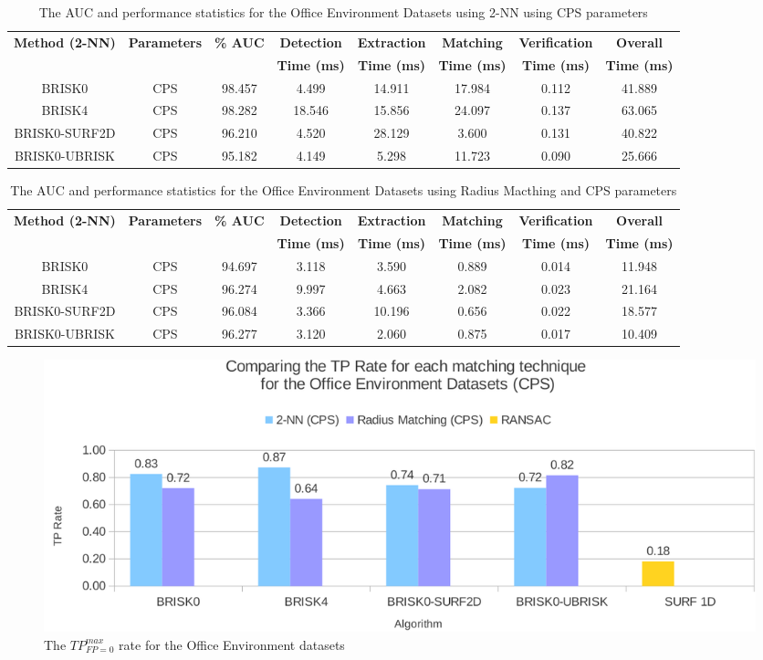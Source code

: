 \begin{table}
\centering
\caption{The AUC and performance statistics for the Office Environment Datasets
using 2-NN using CPS parameters}
\begin{tabular}{|c|c|c|c|c|c|c|c|}
\hline 
\textbf{Method (2-NN)} & \textbf{Parameters} & \textbf{\% AUC} & \textbf{Detection} & \textbf{Extraction} & \textbf{Matching} & \textbf{Verification} & \textbf{Overall}\tabularnewline
 &  &  & \textbf{Time (ms)} & \textbf{Time (ms)} & \textbf{Time (ms)} & \textbf{Time (ms)} & \textbf{Time (ms)}\tabularnewline
\hline 
\hline 
BRISK0 & CPS & 98.457 & 4.499 & 14.911 & 17.984 & 0.112 & 41.889\tabularnewline
\hline 
BRISK4 & CPS & 98.282 & 18.546 & 15.856 & 24.097 & 0.137 & 63.065\tabularnewline
\hline 
BRISK0-SURF2D & CPS & 96.210 & 4.520 & 28.129 & 3.600 & 0.131 & 40.822\tabularnewline
\hline 
BRISK0-UBRISK & CPS & 95.182 & 4.149 & 5.298 & 11.723 & 0.090 & 25.666\tabularnewline
\hline 
\end{tabular}
\label{app:oe_knn}
\end{table}

\begin{table}
\centering
\caption{The AUC and performance statistics for the Office Environment Datasets
using Radius Macthing and CPS parameters}
\begin{tabular}{|c|c|c|c|c|c|c|c|}
\hline 
\textbf{Method (2-NN)} & \textbf{Parameters} & \textbf{\% AUC} & \textbf{Detection} & \textbf{Extraction} & \textbf{Matching} & \textbf{Verification} & \textbf{Overall}\tabularnewline
 &  &  & \textbf{Time (ms)} & \textbf{Time (ms)} & \textbf{Time (ms)} & \textbf{Time (ms)} & \textbf{Time (ms)}\tabularnewline
\hline 
\hline 
BRISK0 & CPS & 94.697 & 3.118 & 3.590 & 0.889 & 0.014 & 11.948\tabularnewline
\hline 
BRISK4 & CPS & 96.274 & 9.997 & 4.663 & 2.082 & 0.023 & 21.164\tabularnewline
\hline 
BRISK0-SURF2D & CPS & 96.084 & 3.366 & 10.196 & 0.656 & 0.022 & 18.577\tabularnewline
\hline 
BRISK0-UBRISK & CPS & 96.277 & 3.120 & 2.060 & 0.875 & 0.017 & 10.409\tabularnewline
\hline 
\end{tabular}
\label{app:oe_hamming}
\end{table}

\begin{figure}
  \centering
    \includegraphics[width=1.0\textwidth]{../Drawings/Graphs/tp_rate_oe_cps.pdf}
    \caption{The $TP_{FP=0}^{max}$ rate for the Office Environment datasets} 
    \label{app:tp_rate_oe}
\end{figure}


